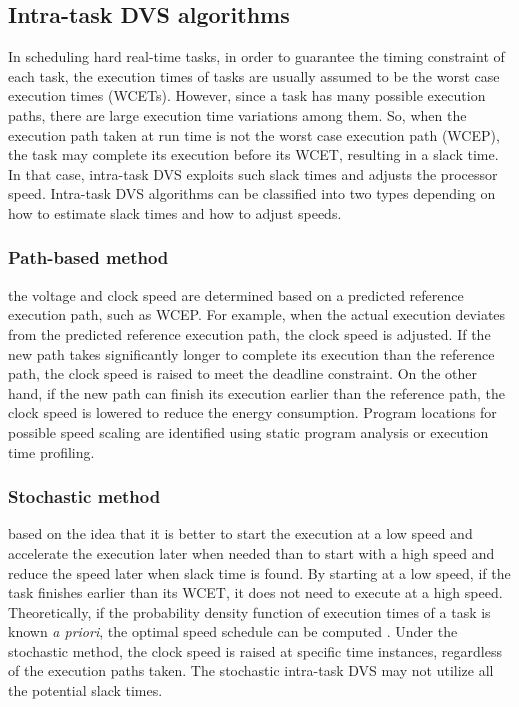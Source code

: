 \documentclass[10pt,article]{IEEEtran}
\begin{document}
\subsection{Intra-task DVS algorithms} 
In  scheduling hard real-time tasks, in order to guarantee the timing constraint of each task,  the execution times of tasks are usually assumed to be the worst case execution times (WCETs).  However, since a task has many possible execution paths, there are large execution time variations among them. So, when the execution path taken at run time is not the worst case execution path (WCEP), the task may complete its execution before its WCET, resulting in a slack time. In that case, intra-task DVS exploits such slack times and adjusts the processor speed. Intra-task DVS algorithms can be classified into two types depending on how to estimate slack times and how to adjust speeds.

\subsubsection{Path-based method} the voltage and clock speed are determined based on a predicted reference execution path, such as WCEP. For example, when the actual execution deviates from the predicted reference execution path, the clock speed is adjusted.  If the new path takes significantly longer to complete its execution than the reference path, the clock speed is raised to meet the deadline constraint. On the other hand, if the new path can finish its execution earlier than the reference path, the clock speed is lowered to reduce the energy consumption. Program locations for possible speed scaling are identified using static program analysis\cite{shin-kim-lee} or execution time profiling\cite{lee-sakurai}.


\subsubsection{Stochastic method}
based on the idea that it is better to start the execution at a low speed and accelerate the execution later when needed than to start with a high speed and reduce the speed later when slack time is found. By starting at a low speed, if the task finishes earlier than its WCET, it does not need to execute at a high speed. Theoretically, if the probability density function of execution times of a task is known \emph{a priori}, the optimal speed schedule can be computed \cite{gruian}.  Under the stochastic method, the clock speed is raised at specific time instances, regardless of the execution paths taken. The stochastic intra-task DVS may not utilize all the potential slack times.
\end{document}
